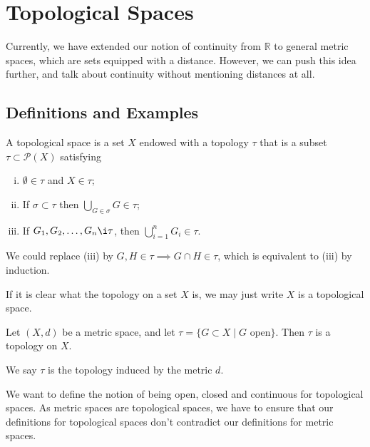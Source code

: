 \documentclass[12pt]{article}
\begin{document}
\newpage

\section{Topological Spaces}%
\label{sec:topological_spaces}

Currently, we have extended our notion of continuity from $\mathbb{R}$ to general metric spaces, which are sets equipped with a distance. However, we can push this idea further, and talk about continuity without mentioning distances at all.

\subsection{Definitions and Examples}%
\label{sub:definitions_and_examples}

\begin{definition}
	A topological space is a set $X$ endowed with a topology $\tau$ that is a subset $\tau \subset \mathcal{P}(X)$ satisfying
	\begin{enumerate}[(i)]
		\item $\emptyset \in \tau$ and $X \in \tau$;
		\item If $\sigma \subset \tau$ then $\bigcup_{G \in \sigma}G \in \tau$;
		\item If $G_1, G_2, \ldots, G_n \i \tau$, then $\bigcup_{i = 1}^{n} G_i \in \tau$.
	\end{enumerate}
\end{definition}

\begin{remark}
	We could replace (iii) by $G, H \in \tau \implies G \cap H \in \tau$, which is equivalent to (iii) by induction.
\end{remark}

If it is clear what the topology on a set $X$ is, we may just write $X$ is a topological space.

\begin{exbox}
	Let $(X, d)$ be a metric space, and let $\tau = \{G \subset X \mid G \text{ open}\}$. Then $\tau$ is a topology on $X$.

	We say $\tau$ is the topology induced by the metric $d$.
\end{exbox}

We want to define the notion of being open, closed and continuous for topological spaces. As metric spaces are topological spaces, we have to ensure that our definitions for topological spaces don't contradict our definitions for metric spaces.
\end{document}
